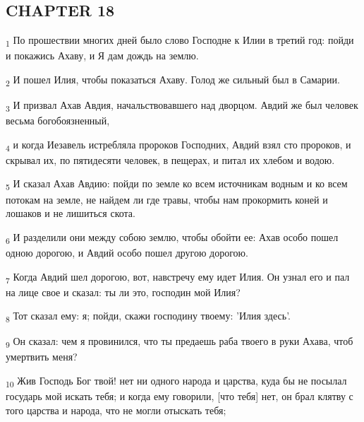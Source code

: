 \subsection{CHAPTER 18}
\begin{tcolorbox}
\textsubscript{1} По прошествии многих дней было слово Господне к Илии в третий год: пойди и покажись Ахаву, и Я дам дождь на землю.
\end{tcolorbox}
\begin{tcolorbox}
\textsubscript{2} И пошел Илия, чтобы показаться Ахаву. Голод же сильный был в Самарии.
\end{tcolorbox}
\begin{tcolorbox}
\textsubscript{3} И призвал Ахав Авдия, начальствовавшего над дворцом. Авдий же был человек весьма богобоязненный,
\end{tcolorbox}
\begin{tcolorbox}
\textsubscript{4} и когда Иезавель истребляла пророков Господних, Авдий взял сто пророков, и скрывал их, по пятидесяти человек, в пещерах, и питал их хлебом и водою.
\end{tcolorbox}
\begin{tcolorbox}
\textsubscript{5} И сказал Ахав Авдию: пойди по земле ко всем источникам водным и ко всем потокам на земле, не найдем ли где травы, чтобы нам прокормить коней и лошаков и не лишиться скота.
\end{tcolorbox}
\begin{tcolorbox}
\textsubscript{6} И разделили они между собою землю, чтобы обойти ее: Ахав особо пошел одною дорогою, и Авдий особо пошел другою дорогою.
\end{tcolorbox}
\begin{tcolorbox}
\textsubscript{7} Когда Авдий шел дорогою, вот, навстречу ему идет Илия. Он узнал его и пал на лице свое и сказал: ты ли это, господин мой Илия?
\end{tcolorbox}
\begin{tcolorbox}
\textsubscript{8} Тот сказал ему: я; пойди, скажи господину твоему: 'Илия здесь'.
\end{tcolorbox}
\begin{tcolorbox}
\textsubscript{9} Он сказал: чем я провинился, что ты предаешь раба твоего в руки Ахава, чтоб умертвить меня?
\end{tcolorbox}
\begin{tcolorbox}
\textsubscript{10} Жив Господь Бог твой! нет ни одного народа и царства, куда бы не посылал государь мой искать тебя; и когда ему говорили, [что тебя] нет, он брал клятву с того царства и народа, что не могли отыскать тебя;
\end{tcolorbox}
